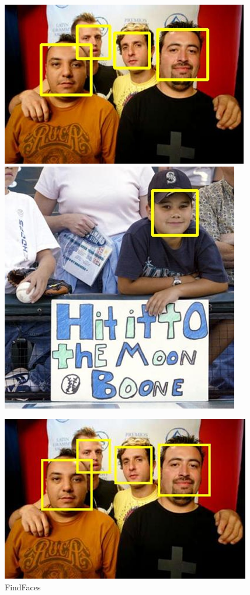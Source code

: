 \begin{figure}[h]
\begin{minipage}{.33\textwidth}
		\centering \includegraphics[width=0.95\linewidth]{illustrations/faces/1/Haar}
		\centering \includegraphics[width=0.95\linewidth]{illustrations/faces/2/Haar}
	\end{minipage}
	\begin{minipage}{.33\textwidth}
		\caption{FindFaces}
		\centering \includegraphics[width=0.95\linewidth]{illustrations/faces/1/FF}

\end{minipage}
\end{figure}
